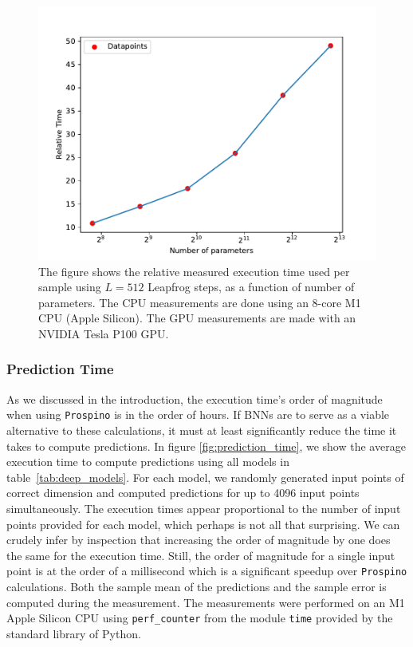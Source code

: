 \begin{figure}[h!]
    \centering
    \includegraphics[scale=0.7]{figures/cpu_vs_gpu/cpu_vs_gpu_performance.pdf}
    \caption{The figure shows the relative measured execution time used per sample using $L = 512$ Leapfrog steps,
    as a function of number of parameters. The CPU measurements are done using an 8-core M1 CPU (Apple Silicon). The GPU measurements
    are made with an NVIDIA Tesla P100 GPU.
    }
    \label{fig:relative_performance}
\end{figure}

\subsubsection{Prediction Time}
As we discussed in the introduction, the execution time's order of magnitude when using {\tt Prospino} is in the order of hours. 
If BNNs are to serve as a viable alternative to these calculations, it must at least significantly reduce the time it takes to compute predictions. In figure \ref{fig:prediction_time}, we 
show the average execution time to compute predictions using all models in table~\ref{tab:deep_models}.
For each model, we randomly generated input points of correct dimension and computed predictions for up to 4096 input points simultaneously.
The execution times appear proportional to the number of input points provided for each model, which perhaps is not all that surprising. We can crudely infer by inspection that increasing the order of magnitude by one does the same for the execution time. Still, the order of magnitude for a single input point is at the order of a millisecond which is a significant speedup over {\tt Prospino} calculations. Both the sample mean of the predictions and the sample error is computed during the measurement. The measurements were performed on an M1 Apple Silicon CPU using {\tt perf\_counter} from the module {\tt time} provided by the standard library of Python.

